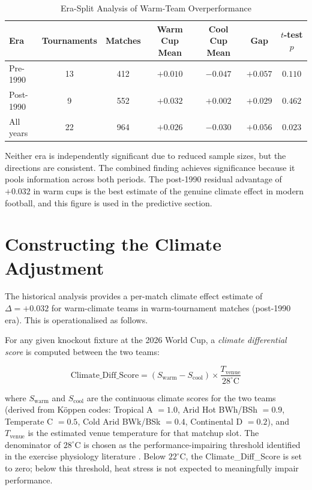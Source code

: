 \documentclass[11pt,a4paper]{article}
\begin{document}
\begin{table}[H]
    \centering
    \caption{Era-Split Analysis of Warm-Team Overperformance}
    \label{tab:era}
    \begin{tabular}{@{}lcccccc@{}}
        \toprule
        Era & Tournaments & Matches & Warm Cup Mean & Cool Cup Mean & Gap & $t$-test $p$ \\
        \midrule
        Pre-1990 & 13 & 412 & $+0.010$ & $-0.047$ & $+0.057$ & $0.110$ \\
        Post-1990 & 9 & 552 & $+0.032$ & $+0.002$ & $+0.029$ & $0.462$ \\
        All years & 22 & 964 & $+0.026$ & $-0.030$ & $+0.056$ & $0.023$ \\
        \bottomrule
    \end{tabular}
\end{table}

Neither era is independently significant due to reduced sample sizes, but the directions are consistent. The combined finding achieves significance because it pools information across both periods. The post-1990 residual advantage of $+0.032$ in warm cups is the best estimate of the genuine climate effect in modern football, and this figure is used in the predictive section.

\newpage

\section{Constructing the Climate Adjustment}

The historical analysis provides a per-match climate effect estimate of $\Delta = +0.032$ for warm-climate teams in warm-tournament matches (post-1990 era). This is operationalised as follows.

For any given knockout fixture at the 2026 World Cup, a \textit{climate differential score} is computed between the two teams:

\begin{equation}
    \text{Climate\_Diff\_Score} = (S_{\text{warm}} - S_{\text{cool}}) \times \frac{T_{\text{venue}}}{28^{\circ}\text{C}}
\end{equation}

where $S_{\text{warm}}$ and $S_{\text{cool}}$ are the continuous climate scores for the two teams (derived from K\"{o}ppen codes: Tropical A $=1.0$, Arid Hot BWh/BSh $=0.9$, Temperate C $=0.5$, Cold Arid BWk/BSk $=0.4$, Continental D $=0.2$), and $T_{\text{venue}}$ is the estimated venue temperature for that matchup slot. The denominator of $28^{\circ}$C is chosen as the performance-impairing threshold identified in the exercise physiology literature \citep{chmura2017}. Below $22^{\circ}$C, the Climate\_Diff\_Score is set to zero; below this threshold, heat stress is not expected to meaningfully impair performance.
\end{document}
